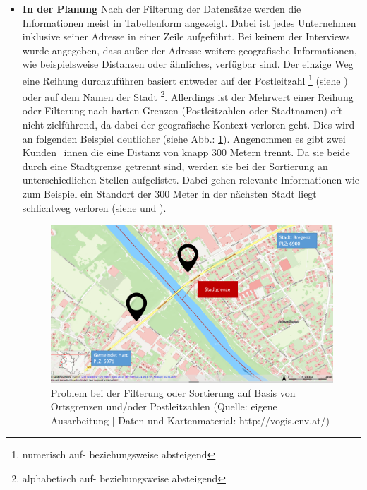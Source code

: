 \documentclass[Bachelorarbeit.tex]{subfiles}
\begin{document}
\begin{itemize}
	
\item \textbf{In der Planung}
\label{UebersichtStandortePlanung}
Nach der Filterung der Datensätze werden die Informationen meist in Tabellenform angezeigt.
Dabei ist jedes Unternehmen inklusive seiner Adresse in einer Zeile aufgeführt.
Bei keinem der Interviews wurde angegeben, dass außer der Adresse weitere geografische Informationen, wie beispielsweise Distanzen oder ähnliches, verfügbar sind.
Der einzige Weg eine Reihung durchzuführen basiert entweder auf der Postleitzahl
\footnote{
	numerisch auf- beziehungsweise absteigend
	} 
(siehe ) oder auf dem Namen der Stadt
\footnote{
	alphabetisch auf- beziehungsweise absteigend
	}. 
Allerdings ist der Mehrwert einer Reihung oder Filterung nach harten Grenzen (Postleitzahlen oder Stadtnamen) oft nicht zielführend, da dabei der geografische Kontext verloren geht.
Dies wird an folgenden Beispiel deutlicher (siehe Abb.: \ref{fig:HarteGrenzen}). 
Angenommen es gibt zwei Kunden\_innen die eine Distanz von knapp 300 Metern trennt. 
Da sie beide durch eine Stadtgrenze getrennt sind, werden sie bei der Sortierung an unterschiedlichen Stellen aufgelistet.
Dabei gehen relevante Informationen wie zum Beispiel ein Standort der 300 Meter in der nächsten Stadt liegt schlichtweg verloren (siehe  und ). 
 
\begin{figure}[h]
\centering
\includegraphics[width=1\linewidth]{img/Interviews/HarteGrenzen}
\caption[Probleme mit harten Grenzen]{Problem bei der Filterung oder Sortierung auf Basis von Ortsgrenzen und/oder Postleitzahlen (Quelle: eigene Ausarbeitung | Daten und Kartenmaterial: http://vogis.cnv.at/)}
\label{fig:HarteGrenzen}
\end{figure}


\end{itemize}
\end{document}
